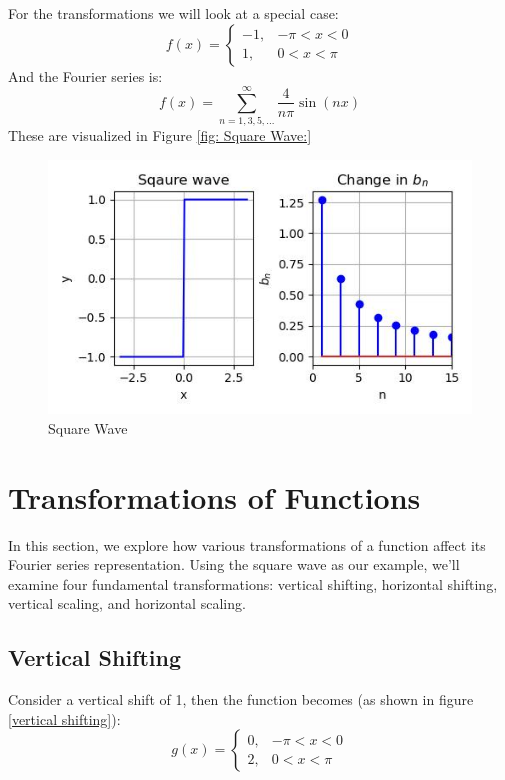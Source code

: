 \documentclass{article}
\begin{document}
For the transformations we will look at a special case:
\begin{equation}
f(x) = 
\begin{cases} 
-1, & -\pi < x < 0 \\
1, & 0 < x < \pi
\end{cases}
\end{equation}
And the Fourier series is:
$$f(x) =  \sum_{n=1,3,5,...}^{\infty} \frac{4}{n\pi} \sin\left(n x\right)$$
These are visualized  in Figure \ref{fig: Square Wave:}
\begin{figure}
    \centering
    \includegraphics[width=\textwidth]{sqaurewave.jpg}
    \caption{Square Wave}
    \label{fig: Square Wave}
\end{figure}

\section{Transformations of Functions}

In this section, we explore how various transformations of a function affect its Fourier series representation. Using the square wave as our example, we'll examine four fundamental transformations: vertical shifting, horizontal shifting, vertical scaling, and horizontal scaling.

\subsection{Vertical Shifting}   
Consider a vertical shift of 1, then the function becomes (as shown in figure \ref{vertical shifting}):
\begin{equation}
g(x) = 
\begin{cases} 
0, & -\pi < x < 0 \\
2, & 0 < x < \pi
\end{cases}
\end{equation}
\end{document}
